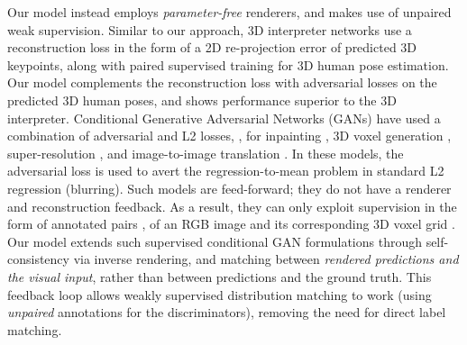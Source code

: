 \documentclass[10pt,twocolumn,letterpaper]{article}
\newcommand\todo[1]{\textcolor{red}{#1}}
\begin{document}
\begin{bibunit}[ieee]
Our model instead employs \textit{parameter-free} renderers, and makes use of unpaired weak supervision. 
Similar to our approach, 3D interpreter networks \cite{Wu2016} use a reconstruction loss in the form of a 2D re-projection error of predicted 3D keypoints, along with paired  supervised training for 3D human pose estimation.  
Our model complements the reconstruction loss with adversarial losses on the predicted 3D human poses, and shows performance superior to the 3D interpreter. 
Conditional Generative Adversarial Networks (GANs) have used a combination of adversarial and L2 losses, \eg, for  inpainting \cite{pathakCVPR16context}, 3D voxel generation \cite{3dgan},  super-resolution \cite{DBLP:journals/corr/DongLHT15}, and image-to-image translation \cite{DBLP:journals/corr/IsolaZZE16}. In these models, the adversarial loss is used to avert the regression-to-mean problem in standard L2 regression (\ie blurring). 
Such models are feed-forward; they do not have a renderer and reconstruction feedback. 
As a result, they can only exploit supervision in the form of annotated pairs \eg, of an RGB image and its corresponding 3D voxel grid \cite{3dgan}. 
Our model extends such supervised conditional GAN formulations through  self-consistency via inverse rendering, and matching  between \textit{rendered predictions and the visual input}, rather than between predictions and the ground truth. This feedback loop allows weakly supervised distribution matching to work (using \textit{unpaired} annotations for the discriminators), removing the need for direct label matching. 


\end{bibunit}
\end{document}
